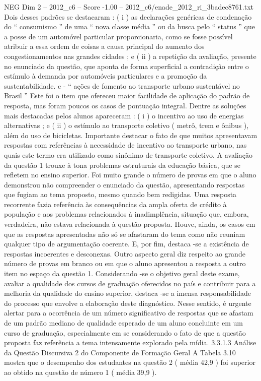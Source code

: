 \begin{textsample}{NEG Dim 2 – 2012\_c6 – Score -1.00 – 2012\_c6/enade\_2012\_ri\_3badec8761.txt}
Dois desses padrões se destacaram : ( i ) as declarações genéricas de condenação do “ consumismo ” de uma “ nova classe média ” ou da busca pelo “ status ” que a posse de um automóvel particular proporcionaria, como se fosse possível atribuir a essa ordem de coisas a causa principal do aumento dos congestionamentos nas grandes cidades ; e ( ii ) a repetição da avaliação, presente no enunciado da questão, que aponta de forma superficial a contradição entre o estímulo à demanda por automóveis particulares e a promoção da sustentabilidade. c - “ ações de fomento ao transporte urbano sustentável no Brasil ” Este foi o item que ofereceu maior facilidade de aplicação do padrão de resposta, mas foram poucos os casos de pontuação integral.
Dentre as soluções mais destacadas pelos alunos apareceram : ( i ) o incentivo ao uso de energias alternativas ; e ( ii ) o estímulo ao transporte coletivo ( metrô, trem e ônibus ), além do uso de bicicletas.
Importante destacar o fato de que muitos apresentavam respostas com referências à necessidade de incentivo ao transporte urbano, nas quais este termo era utilizado como sinônimo de transporte coletivo.
A avaliação da questão 1 trouxe à tona problemas estruturais da educação básica, que se refletem no ensino superior.
Foi muito grande o número de provas em que o aluno demonstrou não compreender o enunciado da questão, apresentando respostas que fugiam ao tema proposto, mesmo quando bem redigidas.
Uma resposta recorrente fazia referência às consequências da ampla oferta de crédito à população e aos problemas relacionados à inadimplência, situação que, embora, verdadeira, não estava relacionada à questão proposta.
Houve, ainda, os casos em que as respostas apresentadas não só se afastaram do tema como não reuniam qualquer tipo de argumentação coerente.
E, por fim, destaca -se a existência de respostas incoerentes e desconexas.
Outro aspecto geral diz respeito ao grande número de provas em branco ou em que o aluno apresentou a resposta a outro item no espaço da questão 1.
Considerando -se o objetivo geral deste exame, avaliar a qualidade dos cursos de graduação oferecidos no país e contribuir para a melhoria da qualidade do ensino superior, destaca -se a imensa responsabilidade do processo que envolve a elaboração deste diagnóstico.
Nesse sentido, é urgente alertar para a ocorrência de um número significativo de respostas que se afastam de um padrão mediano de qualidade esperado de um aluno concluinte em um curso de graduação, especialmente em se considerando o fato de que a questão proposta faz referência a tema intensamente explorado pela mídia. 3.3.1.3 Análise da Questão Discursiva 2 do Componente de Formação Geral A Tabela 3.10 mostra que o desempenho dos estudantes na questão 2 ( média 42,9 ) foi superior ao obtido na questão de número 1 ( média 39,9 ).

\end{textsample}

